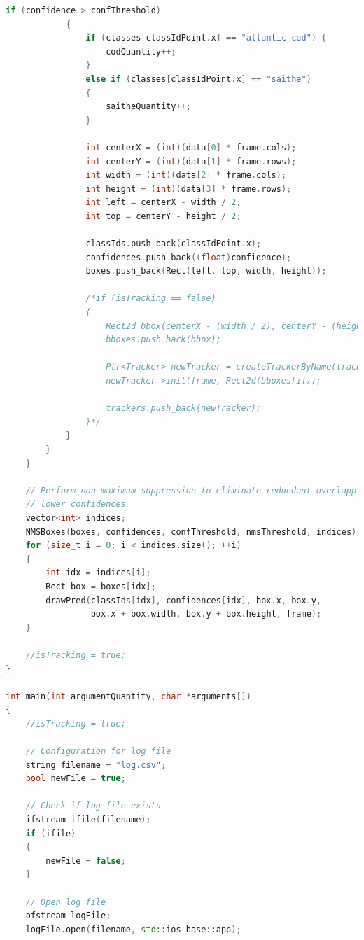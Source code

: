\begin{lstlisting}[language=C++, caption=main.cpp]
            if (confidence > confThreshold)
            {
                if (classes[classIdPoint.x] == "atlantic cod") {
                    codQuantity++;
                }
                else if (classes[classIdPoint.x] == "saithe")
                {
                    saitheQuantity++;
                }

                int centerX = (int)(data[0] * frame.cols);
                int centerY = (int)(data[1] * frame.rows);
                int width = (int)(data[2] * frame.cols);
                int height = (int)(data[3] * frame.rows);
                int left = centerX - width / 2;
                int top = centerY - height / 2;

                classIds.push_back(classIdPoint.x);
                confidences.push_back((float)confidence);
                boxes.push_back(Rect(left, top, width, height));

                /*if (isTracking == false)
                {
                    Rect2d bbox(centerX - (width / 2), centerY - (height / 2), width, height); // KCF works best with a tight crop
                    bboxes.push_back(bbox);

                    Ptr<Tracker> newTracker = createTrackerByName(trackerTypes[2]); // Use KCF
                    newTracker->init(frame, Rect2d(bboxes[i]));

                    trackers.push_back(newTracker);
                }*/
            }
        }
    }

    // Perform non maximum suppression to eliminate redundant overlapping boxes with
    // lower confidences
    vector<int> indices;
    NMSBoxes(boxes, confidences, confThreshold, nmsThreshold, indices);
    for (size_t i = 0; i < indices.size(); ++i)
    {
        int idx = indices[i];
        Rect box = boxes[idx];
        drawPred(classIds[idx], confidences[idx], box.x, box.y,
                 box.x + box.width, box.y + box.height, frame);
    }

    //isTracking = true;
}

int main(int argumentQuantity, char *arguments[])
{
    //isTracking = true;

    // Configuration for log file
    string filename = "log.csv";
    bool newFile = true;

    // Check if log file exists
    ifstream ifile(filename);
    if (ifile)
    {
        newFile = false;
    }

    // Open log file
    ofstream logFile;
    logFile.open(filename, std::ios_base::app);


\end{lstlisting}
